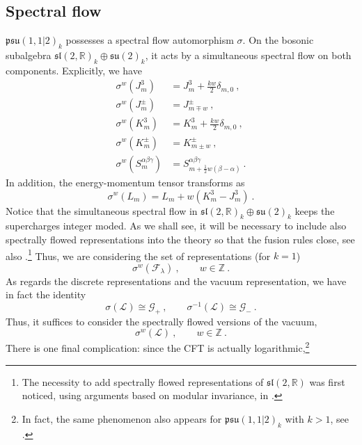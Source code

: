 \documentclass[12pt,a4paper]{article}
\newcommand{\be}{\begin{equation}}
\newcommand{\ee}{\end{equation}}
\begin{document}
\subsection{Spectral flow} \label{subsec:spectral flow}
$\mathfrak{psu}(1,1|2)_k$ possesses a spectral flow automorphism $\sigma$. On the bosonic subalgebra $\mathfrak{sl}(2,\mathds{R})_k \oplus \mathfrak{su}(2)_k$, it acts by a simultaneous spectral flow on both components. Explicitly, we have
\begin{subequations}
\begin{align}
\sigma^w (J^3_m)&=J^3_m+\tfrac{kw}{2}\delta_{m,0}\ , \label{eq:spectral flow a}\\
\sigma^w(J^\pm_m)&=J^\pm_{m\mp w}\ , \label{eq:spectral flow b}\\
\sigma^w(K^3_m)&=K^3_m+\tfrac{k w}{2}\delta_{m,0}\ , \label{eq:spectral flow c}\\
\sigma^w(K^\pm_m)&=K^\pm_{m \pm w}\ , \label{eq:spectral flow d}\\
\sigma^w(S^{\alpha\beta\gamma}_m)&=S^{\alpha\beta\gamma}_{m+\frac{1}{2}w(\beta-\alpha)}\ .\label{eq:spectral flow e}
\end{align}
\end{subequations}
In addition, the energy-momentum tensor transforms as 
\be 
\sigma^w(L_m)= L_m+w(K_m^3-J_m^3)\ . \label{eq:spectral flow f} 
\ee
Notice that the simultaneous spectral flow in $\mathfrak{sl}(2,\mathds{R})_k \oplus \mathfrak{su}(2)_k$ keeps the supercharges integer moded. As we shall see, it will be necessary to include also spectrally flowed representations into the theory so that the fusion rules close, see also \cite{Maldacena:2000hw}.\footnote{The necessity to add spectrally flowed representations of $\mathfrak{sl}(2,\mathds{R})$ was first noticed, using arguments based on modular invariance, in  \cite{Henningson:1991jc}.}  Thus, we are considering the set of representations (for $k=1$)
\be 
\sigma^w(\mathscr{F}_\lambda)\ , \qquad w \in \mathds{Z}\ .
\ee
As regards the discrete representations and the vacuum representation, we have in fact the identity
\be 
\sigma(\mathscr{L}) \cong \mathscr{G}_+\ , \qquad \sigma^{-1}(\mathscr{L}) \cong \mathscr{G}_-\ . \label{eq:spectral flow identification}
\ee
Thus, it suffices to consider the spectrally flowed versions of the vacuum,
\be 
\sigma^w(\mathscr{L})\ , \qquad w \in \mathds{Z}\ .
\ee
There is one final complication: since the CFT is actually logarithmic,\footnote{In fact, the same phenomenon also appears for $\mathfrak{psu}(1,1|2)_k$ %
with $k>1$, see \cite{Troost:2011fd,Gaberdiel:2011vf}.}
\end{document}
